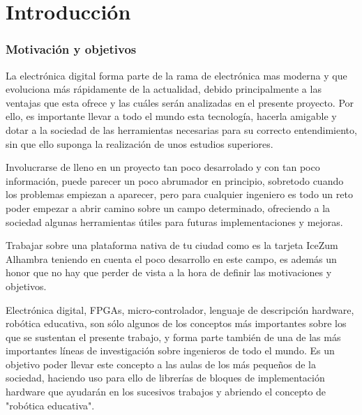 \chapter{Introducción}\label{sec:intro}
\subsection{Motivación y objetivos}
La electrónica digital forma parte de la rama de electrónica mas moderna y que evoluciona más rápidamente de la actualidad, debido principalmente a las ventajas que esta ofrece y las cuáles serán analizadas en el presente proyecto. Por ello, es importante llevar a todo el mundo esta tecnología, hacerla amigable y dotar a la sociedad de las herramientas necesarias para su correcto entendimiento, sin que ello suponga la realización de unos estudios superiores. \newline

\cite{Wyer2017}Involucrarse de lleno en un proyecto tan poco desarrolado y con tan poco información, puede parecer un poco abrumador en principio, sobretodo cuando los problemas empiezan a aparecer, pero para cualquier ingeniero es todo un reto poder empezar a abrir camino sobre un campo determinado, ofreciendo a la sociedad algunas herramientas útiles para futuras implementaciones y mejoras. \newline

Trabajar sobre una plataforma nativa de tu ciudad como es la tarjeta IceZum Alhambra teniendo en cuenta el poco desarrollo en este campo, es además un honor que no hay que perder de vista a la hora de definir las motivaciones y objetivos. \newline

Electrónica digital, FPGAs, micro-controlador, lenguaje de descripción hardware, robótica educativa, son sólo algunos de los conceptos más importantes sobre los que se sustentan el presente trabajo, y forma parte también de una de las más importantes líneas de investigación sobre ingenieros de todo el mundo. Es un objetivo poder llevar este concepto a las aulas de los más pequeños de la sociedad, haciendo uso para ello de librerías de bloques de implementación hardware que ayudarán en los sucesivos trabajos y abriendo el concepto de "robótica educativa". \newline

